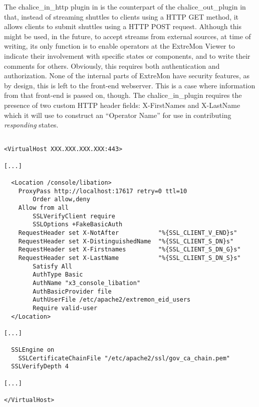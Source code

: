 The chalice\_in\_http plugin in is the counterpart of the
chalice\_out\_plugin in that, instead of streaming shuttles to
clients using a HTTP GET method, it allows clients to submit shuttles
using a HTTP POST request.  Although this might be used, in the future, to
accept \rawproto{} streams from external sources, at time of writing, its
only function is to enable operators at the ExtreMon Viewer to indicate
their involvement with specific states or components, and to write their
comments for others.  Obviously, this requires both authentication and
authorization. None of the internal parts of ExtreMon have security
features, as by design, this is left to the front-end webserver. This is
a case where information from that front-end is passed on, though. The
chalice\_in\_plugin requires the presence of two custom HTTP header
fields: X-FirstNames and X-LastName which it will use to construct an
``Operator Name'' for use in contributing \emph{responding} states.

\begin{lstlisting}[caption=Mutual SSL Authentication and Authorization
using DN,label=lst:libation_apache_snippet]

<VirtualHost XXX.XXX.XXX.XXX:443>

[...]

  <Location /console/libation>
    ProxyPass http://localhost:17617 retry=0 ttl=10
		Order allow,deny
    Allow from all
		SSLVerifyClient require
		SSLOptions +FakeBasicAuth
    RequestHeader set X-NotAfter           "%{SSL_CLIENT_V_END}s"
    RequestHeader set X-DistinguishedName  "%{SSL_CLIENT_S_DN}s"
    RequestHeader set X-Firstnames         "%{SSL_CLIENT_S_DN_G}s"
    RequestHeader set X-LastName           "%{SSL_CLIENT_S_DN_S}s"
		Satisfy All
		AuthType Basic
		AuthName "x3_console_libation"
		AuthBasicProvider file
		AuthUserFile /etc/apache2/extremon_eid_users
		Require valid-user
  </Location>

[...]

  SSLEngine on
	SSLCertificateChainFile "/etc/apache2/ssl/gov_ca_chain.pem"
  SSLVerifyDepth 4

[...]

</VirtualHost>
\end{lstlisting}

